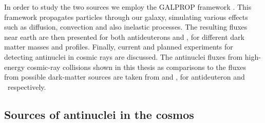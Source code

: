 In order to study the two sources we employ the GALPROP framework \cite{Galprop_propagation}. This framework propagates particles through our galaxy, simulating various effects such as diffusion, convection and also inelastic processes. The resulting fluxes near earth are then presented for both antideuterons and \ahe, for different dark matter masses and profiles. Finally, current and planned experiments for detecting antinuclei in cosmic rays are discussed. 
The antinuclei fluxes from high-energy cosmic-ray collisions shown in this thesis as comparisons to the fluxes from possible dark-matter sources are taken from \cite{dbar_prop} and \cite{ALICE-PUBLIC-2022-001}, for antideuteron and \ahe\ respectively.\\




\subsection{Sources of antinuclei in the cosmos}
